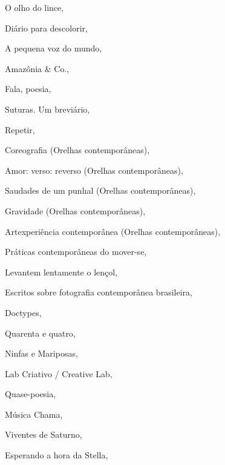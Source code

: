 \begin{multicols}{2}
\begin{enumerate}
{\item O olho do lince, {}
\item Diário para descolorir, {}
\item A pequena voz do mundo, {}
\item Amazônia \& Co., {}
\item Fala, poesia, {}
\item Suturas. Um breviário, {}
\item Repetir, {}
\item Coreografia (Orelhas contemporâneas), {}
\item Amor: verso: reverso (Orelhas contemporâneas), {}
\item Saudades de um punhal (Orelhas contemporâneas), {}
\item Gravidade (Orelhas contemporâneas), {}
\item Artexperiência contemporânea (Orelhas contemporâneas), {}
\item Práticas contemporâneas do mover-se, {}
\item Levantem lentamente o lençol, {}
\item Escritos sobre fotografia contemporânea brasileira, {}
\item Doctypes, {}
\item Quarenta e quatro, {}
\item Ninfas e Mariposas, {}
\item Lab Criativo / Creative Lab, {}
\item Quase-poesia, {}
\item Música Chama, {}
\item Viventes de Saturno, {}
\item Esperando a hora da Stella, {}
}
\end{enumerate}
\end{multicols}
